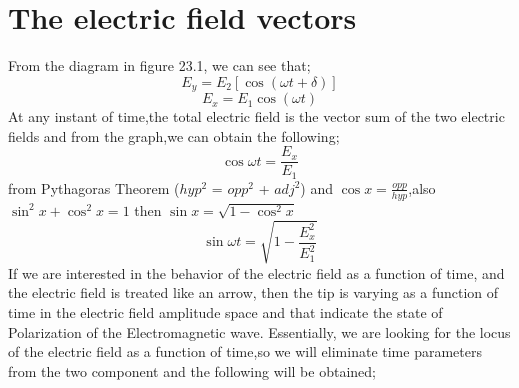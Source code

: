 \section{The electric field vectors} 
From the diagram in figure 23.1, we can see that;
\begin{equation}
E_y = E_2 [\cos(\omega t + \delta)]
\end{equation}
\begin{equation}
E_x = E_1 \cos(\omega t)
\end{equation}
At any instant of time,the total electric field is the vector sum of the two electric  fields and from the graph,we can obtain the following;
\begin{equation}
\cos {\omega t} = \frac {E_x}{E_1} 
\end{equation}
from Pythagoras Theorem ($hyp^2$ = $opp^2$ + $adj^2$) and $ \cos x = \frac{opp}{hyp}$,also $\sin^2 x + \cos^2 x = 1$ then $\sin x = \sqrt{1-\cos^ 2x}$
\begin{equation}
\sin {\omega t} = \sqrt{1 - \frac{E_{x}^2}{E_{1}^2}}
\end{equation}
If we are interested in the behavior of the electric field as a function of time, and the electric field is treated like an arrow, then the tip is varying as a function of time in the electric field amplitude space and that indicate the state of Polarization of the Electromagnetic wave. Essentially, we are looking for the locus of the electric field as a function of time,so we will eliminate time parameters from the two component and the following will be obtained;

